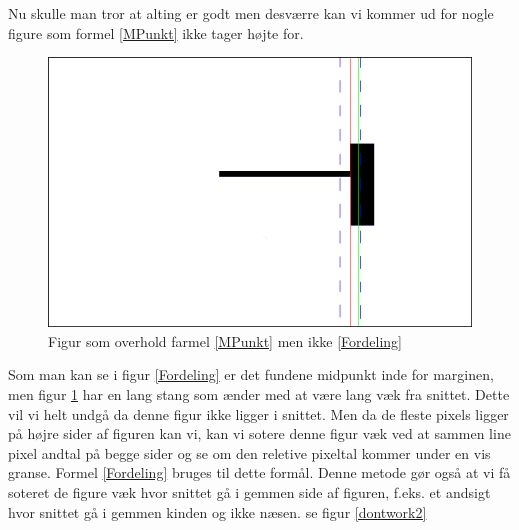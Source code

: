 {Nu skulle man tror at alting er godt men desværre kan vi kommer ud for
nogle figure som formel \ref{MPunkt} ikke tager højte for.

\begin{figure}[h]
	\begin{center}
		\includegraphics[scale=0.5,angle=0]{afsnit/vores_implementation/billeder/udvidet_loesning/dontWork.png}
	\end{center}
	\caption[]{Figur som overhold farmel \ref{MPunkt} men ikke \ref{Fordeling}}
	\label{dontwork}
\end{figure}

Som man kan se i figur \ref{Fordeling} er det fundene midpunkt inde for
marginen, men figur \ref{dontwork} har en lang stang som ænder med at
være lang væk fra snittet. Dette vil vi helt undgå da denne figur ikke
ligger i snittet. Men da de fleste pixels ligger på højre sider af
figuren kan vi, kan vi sotere denne figur væk ved at sammen line pixel
andtal på begge sider og se om den reletive pixeltal kommer under en vis
granse. Formel \ref{Fordeling} bruges til dette formål. Denne metode gør
også at vi få soteret de figure væk hvor snittet gå i gemmen side af
figuren, f.eks. et andsigt hvor snittet gå i gemmen kinden og ikke
næsen. se figur \ref{dontwork2}

}
